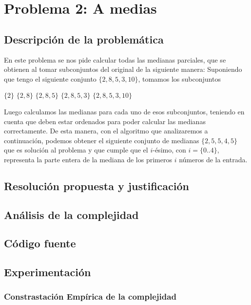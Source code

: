 \section{Problema 2: A medias}

\subsection{Descripción de la problemática}
En este problema se nos pide calcular todas las medianas parciales, que se obtienen al tomar subconjuntos del original de la siguiente manera:
Suponiendo que tengo el siguiente conjunto $\{2,8,5,3,10\}$, tomamos los subconjuntos
\begin{center}
	$\{2\}$ $\{2,8\}$ $\{2,8,5\}$ $\{2,8,5,3\}$ $\{2,8,5,3,10\}$
\end{center}
Luego calculamos las medianas para cada uno de esos subconjuntos, teniendo en cuenta que deben estar ordenados para poder calcular las medianas correctamente. De esta manera, con el algoritmo que analizaremos a continuación, podemos obtener el siguiente conjunto de medianas $\{2,5,5,4,5\}$ que es solución al problema y que cumple que el $i$-ésimo, con $i = \{0 $..$ 4\}$, representa la parte entera de la mediana de los primeros $i$ números de la entrada. 
\subsection{Resolución propuesta y justificación}

\subsection{Análisis de la complejidad}

\subsection{Código fuente}

\subsection{Experimentación}

\subsubsection{Constrastación Empírica de la complejidad}


